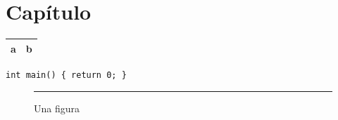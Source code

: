 \documentclass{report}
\begin{document}
\chapter{Capítulo}
\begin{tabularx}{\linewidth}{|l|X|}\hline a & b \\\hline\end{tabularx}
\begin{verbatim}
int main() { return 0; }
\end{verbatim}
\begin{figure}[h]\centering\rule{3cm}{2cm}\caption{Una figura}\end{figure}
\end{document}

